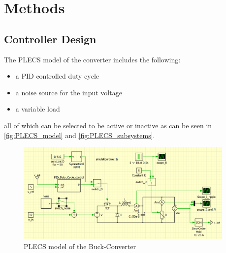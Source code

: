 \chapter{Methods}
\label{chapter:methods}

\section{Controller Design}
\label{section:controller_design}

The PLECS model of the converter includes the following:
\begin{itemize}
    \item a PID controlled duty cycle
    \item a noise source for the input voltage
    \item a variable load
\end{itemize}

all of which can be selected to be active or inactive as can be seen in \autoref{fig:PLECS_model} and \autoref{fig:PLECS_subsystems}.

\begin{figure}[htbp]
    \centering
    \includegraphics[width=0.95\textwidth]{img/PLECS_model_full_view.png}
    \caption{PLECS model of the Buck-Converter}
    \label{fig:PLECS_model}
\end{figure}

